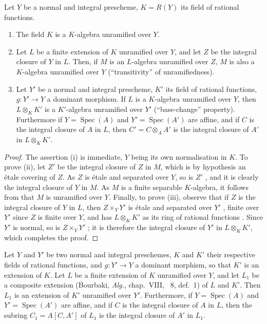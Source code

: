 \begin{proposition}[18.10.13]
\label{IV.18.10.13}
Let $Y$ be a normal and integral prescheme, $K=R(Y)$ its field of rational functions.
\begin{enumerate}[label=\textup{(\roman*)}]
  \item The field $K$ is a $K$-algebra unramified over $Y$.
  \item Let $L$ be a finite extension of $K$ unramified over $Y$, and let $Z$ be the integral closure of $Y$ in $L$.
Then, if $M$ is an $L$-algebra unramified over $Z$, $M$ is also a $K$-algebra unramified over $Y$ \textup{(``transitivity'' of unramifiedness)}.
  \item Let $Y'$ be a normal and integral prescheme, $K'$ its field of rational functions, $g:Y'\to Y$ a dominant morphism.
If $L$ is a $K$-algebra unramified over $Y$, then $L\otimes_{K}K'$ is a $K'$-algebra unramified over $Y'$ \textup{(``base-change'' property)}.
Furthermore if $Y=\operatorname{Spec}(A)$ and $Y'=\operatorname{Spec}(A')$ are affine, and if $C$ is the integral closure of $A$ in $L$, then $C'=C\otimes_{A}A'$ is the integral closure of $A'$ in $L\otimes_{K}K'$.
\end{enumerate}
\end{proposition}

\begin{proof}
The assertion (i) is immediate, $Y$ being its own normalisation in $K$.
To prove (ii), let $Z'$ be the integral closure of $Z$ in $M$, which is by hypothesis an \'etale covering of $Z$.
As $Z$ is \'etale and separated over $Y$, so is $Z'$ , and it is clearly the integral closure of $Y$ in $M$.
As $M$ is a finite separable $K$-algebra, it follows from  that $M$ is unramified over $Y$.
Finally, to prove (iii), observe that if $Z$ is the integral closure of $Y$ in $L$, then $Z\times_{Y}Y'$ is \'etale and separated over $Y'$ , finite over $Y'$ since $Z$ is finite over $Y$, and has $L\otimes_{K}K'$ as its ring of rational functions . Since $Y'$ is normal, so is $Z\times_{Y}Y'$ ; it is therefore the integral closure of $Y'$ in $L\otimes_{K}K'$, which completes the proof.
\end{proof}

\begin{corollary}[18.10.14]
\label{IV.18.10.14}
Let $Y$ and $Y'$ be two normal and integral preschemes, $K$ and $K'$ their respective fields of rational functions, and $g:Y'\to Y$ a dominant morphism, so that $K'$ is an extension of $K$.
Let $L$ be a finite extension of $K$ unramified over $Y$, and let $L_1$ be a composite extension \textup{(Bourbaki, \emph{Alg.}, chap.~VIII, \textsection~8, def.~1) of} $L$ and $K'$.
Then $L_1$ is an extension of $K'$ unramified over $Y'$.
Furthermore, if $Y=\operatorname{Spec}(A)$ and $Y'=\operatorname{Spec}(A')$ are affine, and if $C$ is the integral closure of $A$ in $L$, then the subring $C_1=A[C,A']$ of $L_1$ is the integral closure of $A'$ in $L_1$.
\end{corollary}

